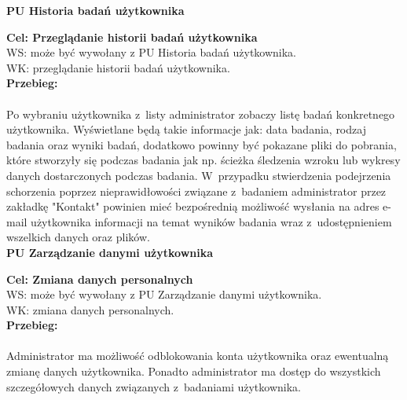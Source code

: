 \documentclass[12pt, letterpaper]{article}
\begin{document}
		
		\textbf{PU Historia badań użytkownika}
		
		\quad
		
		\textbf{Cel: Przeglądanie historii badań użytkownika}\\
		
		WS: może być wywołany z PU Historia badań użytkownika.\\
		
		WK: przeglądanie historii badań użytkownika. \\
		
		\textbf{Przebieg:}
\paragraph{}Po wybraniu użytkownika z~listy administrator zobaczy listę badań konkretnego użytkownika. Wyświetlane będą takie informacje jak: data badania, rodzaj badania oraz wyniki badań, dodatkowo powinny być pokazane pliki do pobrania, które stworzyły się podczas badania jak np. ścieżka śledzenia wzroku lub wykresy danych dostarczonych podczas badania. W~przypadku stwierdzenia podejrzenia schorzenia poprzez nieprawidłowości związane z~badaniem administrator przez zakładkę "Kontakt" powinien mieć bezpośrednią możliwość wysłania na adres e-mail użytkownika informacji na temat wyników badania wraz z~udostępnieniem wszelkich danych oraz plików.\\
		
		
		\textbf{PU Zarządzanie danymi użytkownika}
		
		\quad
		
		\textbf{Cel: Zmiana danych personalnych}\\
		
		WS: może być wywołany z PU Zarządzanie danymi użytkownika.\\
		
		WK: zmiana danych personalnych.\\
		
		\textbf{Przebieg:}
\paragraph{}Administrator ma możliwość odblokowania konta użytkownika oraz ewentualną zmianę danych użytkownika. Ponadto administrator ma dostęp do wszystkich szczegółowych danych związanych z~badaniami użytkownika.\\
\end{document}
